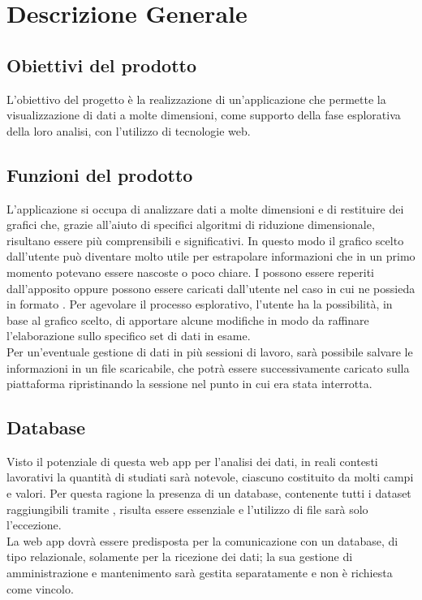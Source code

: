 \section{Descrizione Generale}
\subsection{Obiettivi del prodotto}
L'obiettivo del progetto è la realizzazione di un'applicazione che permette la visualizzazione di dati a molte dimensioni, come supporto della fase esplorativa della loro analisi, con l'utilizzo di tecnologie web.
\subsection{Funzioni del prodotto}
L'applicazione si occupa di analizzare dati a molte dimensioni e di restituire dei grafici che, grazie all'aiuto di specifici algoritmi di riduzione dimensionale, risultano essere più comprensibili e significativi. In questo modo il grafico scelto dall'utente può diventare molto utile per estrapolare informazioni che in un primo momento potevano essere nascoste o poco chiare. I  possono essere reperiti dall'apposito  oppure possono essere caricati dall'utente nel caso in cui ne possieda in formato . Per agevolare il processo esplorativo, l'utente ha la possibilità, in base al grafico scelto, di apportare alcune modifiche in modo da raffinare l'elaborazione sullo specifico set di dati in esame.\\ Per un'eventuale gestione di dati in più sessioni di lavoro, sarà possibile salvare le informazioni in un file scaricabile, che potrà essere successivamente caricato sulla piattaforma ripristinando la sessione nel punto in cui era stata interrotta.

\subsection{Database}
Visto il potenziale di questa web app per l'analisi dei dati, in reali contesti lavorativi la quantità di  studiati sarà notevole, ciascuno costituito da molti campi e valori. Per questa ragione la presenza di un database, contenente tutti i dataset raggiungibili tramite , risulta essere essenziale e l'utilizzo di file  sarà solo l'eccezione. \\
La web app dovrà essere predisposta per la comunicazione con un database, di tipo relazionale, solamente per la ricezione dei dati; la sua gestione di amministrazione e mantenimento sarà gestita separatamente e non è richiesta come vincolo.

